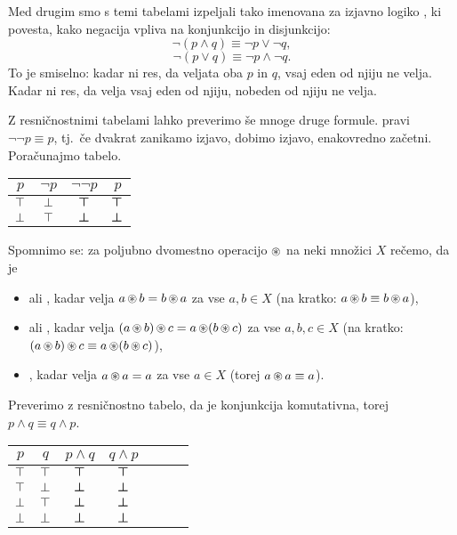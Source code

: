 		Med drugim smo s temi tabelami izpeljali tako imenovana  za izjavno logiko , ki povesta, kako negacija vpliva na konjunkcijo in disjunkcijo:
		\[\lnot(p \land q) \equiv \lnot{p} \lor \lnot{q},\]
		\[\lnot(p \lor q) \equiv \lnot{p} \land \lnot{q}.\]
		To je smiselno: kadar ni res, da veljata oba $p$ in $q$, vsaj eden od njiju ne velja. Kadar ni res, da velja vsaj eden od njiju, nobeden od njiju ne velja.
		
		Z resničnostnimi tabelami lahko preverimo še mnoge druge formule.  pravi $\lnot\lnot{p} \equiv p$, tj.~če dvakrat zanikamo izjavo, dobimo izjavo, enakovredno začetni. Poračunajmo tabelo.
		
		\begin{center}
			\begin{tabular}{c|ccc}
				$p$ & $\lnot{p}$ & $\lnot\lnot{p}$ & $p$ \\
				\hline
				$\top$ & $\bot$ & $\bm{\top}$ & $\bm{\top}$ \\
				$\bot$ & $\top$ & $\bm{\bot}$ & $\bm{\bot}$
			\end{tabular}
		\end{center}
		
		Spomnimo se: za poljubno dvomestno operacijo $\mathop{\circledast}$ na neki množici $X$ rečemo, da je
		\begin{itemize}
			\item
				 ali , kadar velja $a \mathop{\circledast} b = b \mathop{\circledast} a$ za vse $a, b \in X$ (na kratko: $a \mathop{\circledast} b \equiv b \mathop{\circledast} a$),
			\item
				  ali , kadar velja $(a \mathop{\circledast} b) \mathop{\circledast} c = a \mathop{\circledast} (b \mathop{\circledast} c)$ za vse $a, b, c \in X$ (na kratko: $(a \mathop{\circledast} b) \mathop{\circledast} c \equiv a \mathop{\circledast} (b \mathop{\circledast} c)$),
			\item
				 , kadar velja $a \mathop{\circledast} a = a$ za vse $a \in X$ (torej $a \mathop{\circledast} a \equiv a$).
		\end{itemize}
		
		Preverimo z resničnostno tabelo, da je konjunkcija komutativna, torej $p \land q \equiv q \land p$.
		
		\begin{center}
			\begin{tabular}{cc|ccccc}
				$p$ & $q$ & $p \land q$ & $q \land p$ \\
				\hline
				$\top$ & $\top$ & $\bm{\top}$ & $\bm{\top}$ \\
				$\top$ & $\bot$ & $\bm{\bot}$ & $\bm{\bot}$ \\
				$\bot$ & $\top$ & $\bm{\bot}$ & $\bm{\bot}$ \\
				$\bot$ & $\bot$ & $\bm{\bot}$ & $\bm{\bot}$
			\end{tabular}
		\end{center}
		
